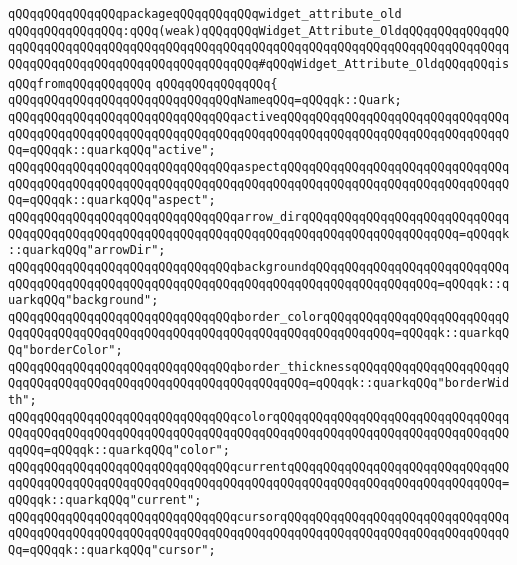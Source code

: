 \newline
\verb|qQQqqQQqqQQqqQQqpackageqQQqqQQqqQQqwidget_attribute_old|\newline
\verb|qQQqqQQqqQQqqQQq:qQQq(weak)qQQqqQQqWidget_Attribute_OldqQQqqQQqqQQqqQQqqQQqqQQqqQQqqQQqqQQqqQQqqQQqqQQqqQQqqQQqqQQqqQQqqQQqqQQqqQQqqQQqqQQqqQQqqQQqqQQqqQQqqQQqqQQqqQQqqQQqqQQq#qQQqWidget_Attribute_OldqQQqqQQqisqQQqfromqQQqqQQqqQQq|\newline
\verb|qQQqqQQqqQQqqQQq{|\newline
\verb|qQQqqQQqqQQqqQQqqQQqqQQqqQQqqQQqNameqQQq=qQQqqk::Quark;|\newline
\newline
\verb|qQQqqQQqqQQqqQQqqQQqqQQqqQQqqQQqactiveqQQqqQQqqQQqqQQqqQQqqQQqqQQqqQQqqQQqqQQqqQQqqQQqqQQqqQQqqQQqqQQqqQQqqQQqqQQqqQQqqQQqqQQqqQQqqQQqqQQqqQQq=qQQqqk::quarkqQQq"active";|\newline
\verb|qQQqqQQqqQQqqQQqqQQqqQQqqQQqqQQqaspectqQQqqQQqqQQqqQQqqQQqqQQqqQQqqQQqqQQqqQQqqQQqqQQqqQQqqQQqqQQqqQQqqQQqqQQqqQQqqQQqqQQqqQQqqQQqqQQqqQQqqQQq=qQQqqk::quarkqQQq"aspect";|\newline
\verb|qQQqqQQqqQQqqQQqqQQqqQQqqQQqqQQqarrow_dirqQQqqQQqqQQqqQQqqQQqqQQqqQQqqQQqqQQqqQQqqQQqqQQqqQQqqQQqqQQqqQQqqQQqqQQqqQQqqQQqqQQqqQQqqQQq=qQQqqk::quarkqQQq"arrowDir";|\newline
\verb|qQQqqQQqqQQqqQQqqQQqqQQqqQQqqQQqbackgroundqQQqqQQqqQQqqQQqqQQqqQQqqQQqqQQqqQQqqQQqqQQqqQQqqQQqqQQqqQQqqQQqqQQqqQQqqQQqqQQqqQQqqQQq=qQQqqk::quarkqQQq"background";|\newline
\verb|qQQqqQQqqQQqqQQqqQQqqQQqqQQqqQQqborder_colorqQQqqQQqqQQqqQQqqQQqqQQqqQQqqQQqqQQqqQQqqQQqqQQqqQQqqQQqqQQqqQQqqQQqqQQqqQQqqQQq=qQQqqk::quarkqQQq"borderColor";|\newline
\verb|qQQqqQQqqQQqqQQqqQQqqQQqqQQqqQQqborder_thicknessqQQqqQQqqQQqqQQqqQQqqQQqqQQqqQQqqQQqqQQqqQQqqQQqqQQqqQQqqQQqqQQq=qQQqqk::quarkqQQq"borderWidth";|\newline
\verb|qQQqqQQqqQQqqQQqqQQqqQQqqQQqqQQqcolorqQQqqQQqqQQqqQQqqQQqqQQqqQQqqQQqqQQqqQQqqQQqqQQqqQQqqQQqqQQqqQQqqQQqqQQqqQQqqQQqqQQqqQQqqQQqqQQqqQQqqQQqqQQq=qQQqqk::quarkqQQq"color";|\newline
\verb|qQQqqQQqqQQqqQQqqQQqqQQqqQQqqQQqcurrentqQQqqQQqqQQqqQQqqQQqqQQqqQQqqQQqqQQqqQQqqQQqqQQqqQQqqQQqqQQqqQQqqQQqqQQqqQQqqQQqqQQqqQQqqQQqqQQqqQQq=qQQqqk::quarkqQQq"current";|\newline
\verb|qQQqqQQqqQQqqQQqqQQqqQQqqQQqqQQqcursorqQQqqQQqqQQqqQQqqQQqqQQqqQQqqQQqqQQqqQQqqQQqqQQqqQQqqQQqqQQqqQQqqQQqqQQqqQQqqQQqqQQqqQQqqQQqqQQqqQQqqQQq=qQQqqk::quarkqQQq"cursor";|\newline
